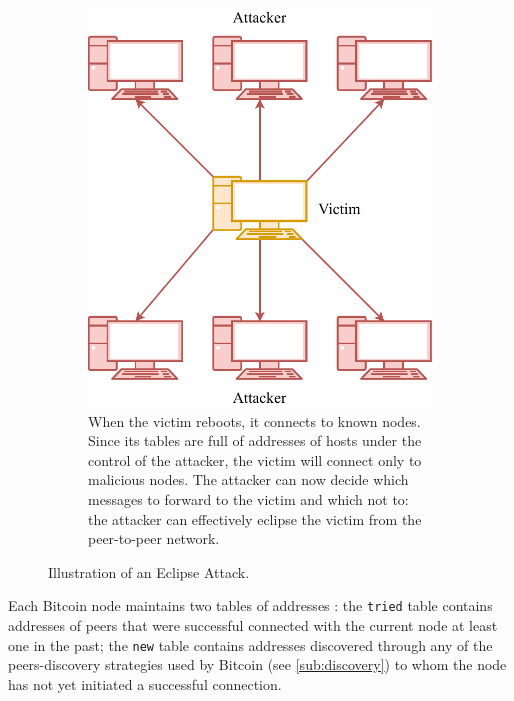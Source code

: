 \begin{figure}[h!]
\begin{subfigure}{.45\textwidth}
{		}
	\end{subfigure}
	\hfill
	\begin{subfigure}{.45\textwidth}
		\vspace*{0.25cm}
		\includegraphics[width=\columnwidth]{figures/eclipse_2}
		\vspace*{0.1cm}
		\caption{
			When the victim reboots, it connects to known nodes.
			Since its tables are full of addresses of hosts under the control of the attacker, the victim will connect only to malicious nodes.
			The attacker can now decide which messages to forward to the victim and which not to:
			the attacker can effectively eclipse the victim from the peer-to-peer network.
		}
	\end{subfigure}
	\caption[Illustration of an Eclipse Attack]{Illustration of an Eclipse Attack.}
	\label{fig:eclipse}
\end{figure}

\medskip
Each Bitcoin node maintains two tables of addresses \cite{eclipse_attack_2015}:
the \texttt{tried} table contains addresses of peers that were successful connected with the current node at least one in the past;
the \texttt{new} table contains addresses discovered through any of the peers-discovery strategies used by Bitcoin (see \cref{sub:discovery}) to whom the node has not yet initiated a successful connection.

